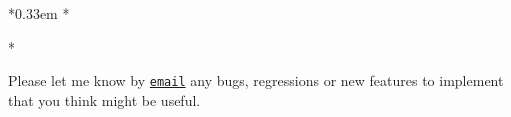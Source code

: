 \documentclass[english,a4paper,10pt]{article}
\begin{document}
\begin{center}
	\Large\parskip0pt \offinterlineskip
	*\kern0.33em *\par
	 *
\end{center}

Please let me know by \href{mailto:unbonpetit@netc.fr}{\texttt{email}} any bugs, regressions or new features to implement that you think might be useful.
\end{document}
